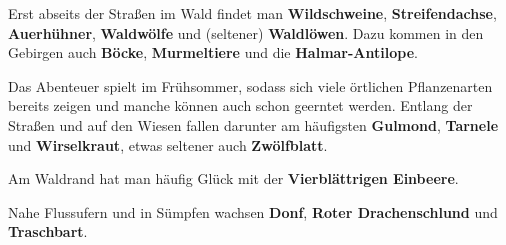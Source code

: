 Erst abseits der Straßen im Wald findet man \textbf{Wildschweine}, \textbf{Streifendachse}, \textbf{Auerhühner}, \textbf{Waldwölfe} und (seltener) \textbf{Waldlöwen}. Dazu kommen in den Gebirgen auch \textbf{Böcke}, \textbf{Murmeltiere} und die \textbf{Halmar-Antilope}.

\neuespalte

Das Abenteuer spielt im Frühsommer, sodass sich viele örtlichen Pflanzenarten bereits zeigen und manche können auch schon geerntet werden. Entlang der Straßen und auf den Wiesen fallen darunter am häufigsten \textbf{Gulmond}, \textbf{Tarnele} und \textbf{Wirselkraut}, etwas seltener auch \textbf{Zwölfblatt}.

Am Waldrand hat man häufig Glück mit der \textbf{Vierblättrigen Einbeere}.

Nahe Flussufern und in Sümpfen wachsen \textbf{Donf}, \textbf{Roter Drachenschlund} und \textbf{Traschbart}.

\spaltenende
\neueseite
\spaltenanfang





